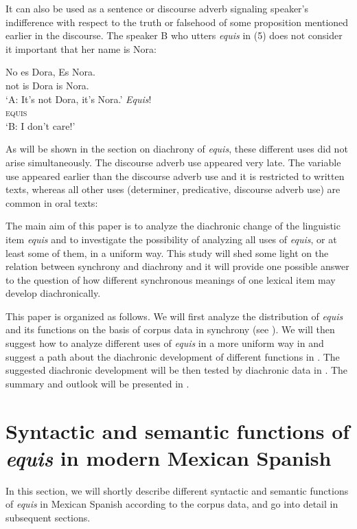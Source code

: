\documentclass[output=paper
,modfonts
,nonflat]{langsci/langscibook}
\begin{document}
It can also be used as a sentence or discourse adverb signaling speaker’s indifference with respect to the truth or falsehood of some proposition mentioned earlier in the discourse. The speaker B who utters \textit{equis} in (5) does not consider it important that her name is Nora:

\ea
\begin{xlist}
\gll No es Dora, Es Nora.\\
not is Dora is Nora.\\
\glt ‘A: It’s not Dora, it’s Nora.’
\gll \textit{Equis}!\\
\textsc{equis}\\
\glt ‘B: I don’t care!’
\end{xlist}
\z

As will be shown in the section on diachrony of \textit{equis}, these different uses did not arise simultaneously. The discourse adverb use appeared very late. The variable use appeared earlier than the discourse adverb use and it is restricted to written texts, whereas all other uses (determiner, predicative, discourse adverb use) are common in oral texts:

The main aim of this paper is to analyze the diachronic change of the linguistic item \textit{equis} and to investigate the possibility of analyzing all uses of \textit{equis}, or at least some of them, in a uniform way. 
This study will shed some light on the relation between synchrony and diachrony and it will provide one possible answer to the question of how different synchronous meanings of one lexical item may develop diachronically.

This paper is organized as follows. We will first analyze the distribution of \textit{equis} and its functions on the basis of corpus data in synchrony (see ). We will then suggest how to analyze different uses of \textit{equis} in a more uniform way in  and suggest a path about the diachronic development of different functions in . The suggested diachronic development will be then tested by diachronic data in . The summary and outlook will be presented in .

\section{Syntactic and semantic functions of \textit{equis} in modern Mexican Spanish}\label{sec:kellert:2}
In this section, we will shortly describe different syntactic and semantic functions of \textit{equis} in Mexican Spanish according to the corpus data, and go into detail in subsequent sections.
\end{document}
